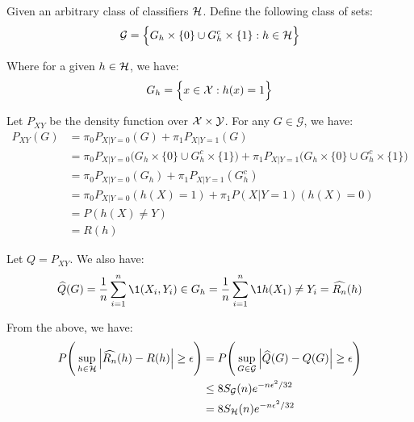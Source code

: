 \begin{solution*}
    Given an arbitrary class of classifiers $\mathcal{H}$. Define the following class of sets:
    \begin{align*}
        \mathcal{G} = \Big\{ 
            G_h \times \{0\} \cup G_h^c \times \{1\} : h \in \mathcal{H}
         \Big\}
    \end{align*}

    \noindent Where for a given $h\in\mathcal{H}$, we have:
    \begin{align*}
        G_h = \Big\{ 
            x \in \mathcal{X} : h(x) = 1
         \Big\}
    \end{align*}

    \noindent Let $P_{XY}$ be the density function over $\mathcal{X}\times\mathcal{Y}$. For any $G\in\mathcal{G}$, we have:
    \begin{align*}
        P_{XY}(G) &= \pi_0P_{X|Y=0}(G) + \pi_1P_{X|Y=1}(G) \\
            &= \pi_0P_{X|Y=0}\Big(G_h \times \{0\} \cup G_h^c \times \{1\}\Big)
                + \pi_1P_{X|Y=1}\Big(G_h \times \{0\} \cup G_h^c \times \{1\}\Big) \\
            &= \pi_0P_{X|Y=0}(G_h) + \pi_1P_{X|Y=1}(G_h^c) \\
            &= \pi_0P_{X|Y=0}(h(X)=1) + \pi_1P(X|Y=1)(h(X)=0) \\
            &= P(h(X) \ne Y) \\
            &= R(h)
    \end{align*}

    \noindent Let $Q=P_{XY}$. We also have:
    \begin{align*}
        \widehat{Q}(G) = \frac{1}{n}\sum_{i=1}^n \1{(X_i, Y_i) \in G_h} = \frac{1}{n}\sum_{i=1}^n \1{h(X_1)\ne Y_i} = \widehat{R_n}(h)
    \end{align*}


    \noindent From the above, we have:
    \begin{align*}
        P\Bigg( 
            \sup_{h\in\mathcal{H}} \Big|  \widehat{R_n}(h) - R(h)  \Big| \ge \epsilon
         \Bigg)
        &= P\Bigg( 
            \sup_{G\in\mathcal{G}} \Big|  \widehat{Q}(G) - Q(G)  \Big| \ge \epsilon
         \Bigg) \\
        &\le 8S_\mathcal{G}(n)e^{-n\epsilon^2/32} \\
        &=   8S_\mathcal{H}(n)e^{-n\epsilon^2/32} \\
    \end{align*}
\end{solution*}

